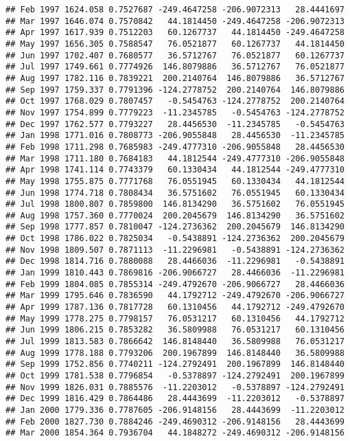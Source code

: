 \documentclass[]{article}
\begin{document}
\begin{verbatim}
## Feb 1997 1624.058 0.7527687 -249.4647258 -206.9072313   28.4441697
## Mar 1997 1646.074 0.7570842   44.1814450 -249.4647258 -206.9072313
## Apr 1997 1617.939 0.7512203   60.1267737   44.1814450 -249.4647258
## May 1997 1656.305 0.7588547   76.0521877   60.1267737   44.1814450
## Jun 1997 1702.407 0.7680577   36.5712767   76.0521877   60.1267737
## Jul 1997 1749.661 0.7774926  146.8079886   36.5712767   76.0521877
## Aug 1997 1782.116 0.7839221  200.2140764  146.8079886   36.5712767
## Sep 1997 1759.337 0.7791396 -124.2778752  200.2140764  146.8079886
## Oct 1997 1768.029 0.7807457   -0.5454763 -124.2778752  200.2140764
## Nov 1997 1754.899 0.7779223  -11.2345785   -0.5454763 -124.2778752
## Dec 1997 1762.577 0.7793227   28.4456530  -11.2345785   -0.5454763
## Jan 1998 1771.016 0.7808773 -206.9055848   28.4456530  -11.2345785
## Feb 1998 1711.298 0.7685983 -249.4777310 -206.9055848   28.4456530
## Mar 1998 1711.180 0.7684183   44.1812544 -249.4777310 -206.9055848
## Apr 1998 1741.114 0.7743379   60.1330434   44.1812544 -249.4777310
## May 1998 1755.875 0.7771768   76.0551945   60.1330434   44.1812544
## Jun 1998 1774.718 0.7808434   36.5751602   76.0551945   60.1330434
## Jul 1998 1800.807 0.7859800  146.8134290   36.5751602   76.0551945
## Aug 1998 1757.360 0.7770024  200.2045679  146.8134290   36.5751602
## Sep 1998 1777.857 0.7810047 -124.2736362  200.2045679  146.8134290
## Oct 1998 1786.022 0.7825034   -0.5438891 -124.2736362  200.2045679
## Nov 1998 1809.507 0.7871113  -11.2296981   -0.5438891 -124.2736362
## Dec 1998 1814.716 0.7880088   28.4466036  -11.2296981   -0.5438891
## Jan 1999 1810.443 0.7869816 -206.9066727   28.4466036  -11.2296981
## Feb 1999 1804.085 0.7855314 -249.4792670 -206.9066727   28.4466036
## Mar 1999 1795.646 0.7836590   44.1792712 -249.4792670 -206.9066727
## Apr 1999 1787.136 0.7817728   60.1310456   44.1792712 -249.4792670
## May 1999 1778.275 0.7798157   76.0531217   60.1310456   44.1792712
## Jun 1999 1806.215 0.7853282   36.5809988   76.0531217   60.1310456
## Jul 1999 1813.583 0.7866642  146.8148440   36.5809988   76.0531217
## Aug 1999 1778.188 0.7793206  200.1967899  146.8148440   36.5809988
## Sep 1999 1752.856 0.7740211 -124.2792491  200.1967899  146.8148440
## Oct 1999 1781.538 0.7796854   -0.5378897 -124.2792491  200.1967899
## Nov 1999 1826.031 0.7885576  -11.2203012   -0.5378897 -124.2792491
## Dec 1999 1816.429 0.7864486   28.4443699  -11.2203012   -0.5378897
## Jan 2000 1779.336 0.7787605 -206.9148156   28.4443699  -11.2203012
## Feb 2000 1827.730 0.7884246 -249.4690312 -206.9148156   28.4443699
## Mar 2000 1854.364 0.7936704   44.1848272 -249.4690312 -206.9148156

\end{verbatim}
\end{document}
